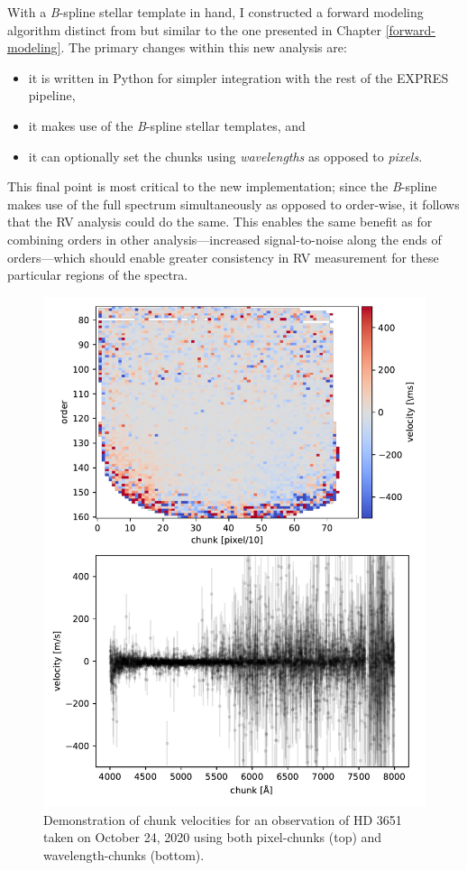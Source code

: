 With a \textit{B}-spline stellar template in hand, I constructed a forward modeling algorithm distinct from but similar to the one presented in Chapter \ref{forward-modeling}. The primary changes within this new analysis are:
\begin{itemize}
    \item it is written in Python for simpler integration with the rest of the EXPRES pipeline,
    \item it makes use of the \textit{B}-spline stellar templates, and
    \item it can optionally set the chunks using \textit{wavelengths} as opposed to \textit{pixels}.
\end{itemize}
This final point is most critical to the new implementation; since the \textit{B}-spline makes use of the full spectrum simultaneously as opposed to order-wise, it follows that the RV analysis could do the same. This enables the same benefit as for combining orders in other analysis---increased signal-to-noise along the ends of orders---which should enable greater consistency in RV measurement for these particular regions of the spectra.

\begin{figure}
    \centering
    \includegraphics[width=\textwidth]{figures-5/chunk-vels.pdf}
    \caption[HD 3651 forward model chunk velocities]{Demonstration of chunk velocities for an observation of HD 3651 taken on October 24, 2020 using both pixel-chunks (top) and wavelength-chunks (bottom).}
    \label{fig:chunk-vels}
\end{figure}

